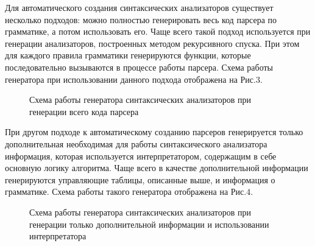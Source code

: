 Для автоматического создания синтаксических анализаторов существует несколько подходов: можно полностью генерировать весь код парсера по грамматике, а потом использовать его. Чаще всего такой подход используется при генерации анализаторов, построенных методом рекурсивного спуска. При этом для каждого правила грамматики генерируются функции, которые последовательно вызываются в процессе работы парсера. Схема работы генератора при использовании данного подхода отображена на Рис.3.

\begin{figure}[h]
\caption{Схема работы генератора синтаксических анализаторов при генерации всего кода парсера}
\label{fig3}
\end{figure}

При другом подходе к автоматическому созданию парсеров генерируется только дополнительная необходимая для работы синтаксического анализатора информация, которая используется интерпретатором, содержащим в себе основную логику алгоритма. Чаще всего в качестве дополнительной информации генерируются управляющие таблицы, описанные выше, и информация о грамматике. Схема работы такого генератора отображена на Рис.4.

\begin{figure}[h]
\caption{Схема работы генератора синтаксических анализаторов при генерации только дополнительной информации и использовании интерпретатора}
\label{fig4}
\end{figure} 

